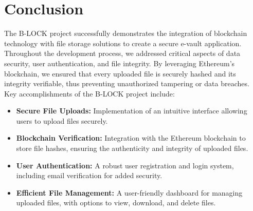 \documentclass[12pt,a4paper]{report}
\begin{document}
\section{Conclusion}
The B-LOCK project successfully demonstrates the integration of blockchain technology with file storage solutions to create a secure e-vault application. Throughout the development process, we addressed critical aspects of data security, user authentication, and file integrity. By leveraging Ethereum's blockchain, we ensured that every uploaded file is securely hashed and its integrity verifiable, thus preventing unauthorized tampering or data breaches.
\\
Key accomplishments of the B-LOCK project include:
\begin{itemize}
\item \textbf{Secure File Uploads:} Implementation of an intuitive interface allowing users to upload files securely.
\item \textbf{Blockchain Verification:} Integration with the Ethereum blockchain to store file hashes, ensuring the authenticity and integrity of uploaded files.
\item \textbf{User Authentication:} A robust user registration and login system, including email verification for added security.
\item \textbf{Efficient File Management:} A user-friendly dashboard for managing uploaded files, with options to view, download, and delete files.

\end{itemize}
\end{document}
